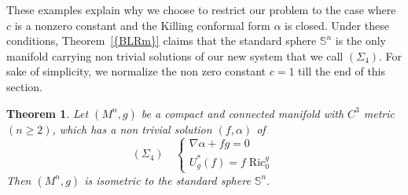\documentclass[a4paper,11pt,leqno]{amsart}
\numberwithin{equation}{section}
\theoremstyle{main}
\newtheorem{thm} {\bf  Theorem} [section]
\begin{document}
These examples explain why we choose to restrict our problem to the case where $c$ is a nonzero constant and the Killing conformal form $\alpha$ is closed. Under these conditions, Theorem~{\ref{{BLRm}}} claims that the standard sphere ${{\mathbb S^{n}}}$ is the only manifold carrying non trivial solutions of our new system that we call $(\Sigma_4)$. For sake of simplicity, we normalize the non zero constant $c=1$ till the end of this section.

\begin{thm}\label{BLRm}
Let $(M^n, g)$ be a compact and connected manifold with $C^3$ metric $(n\ge2)$, which has a non trivial solution $(f,\alpha)$ of
	$$(\Sigma_4)\quad \left\{
\begin{array}{l}
	 \nabla\alpha+ fg= 0 \\
	 U_g^* (f)= f {\operatorname{Ric}}^g_0
\end{array}\right. $$	
Then $(M^n,g)$ is isometric to the standard sphere ${{\mathbb S^{n}}}$. 
\end{thm}
\end{document}
